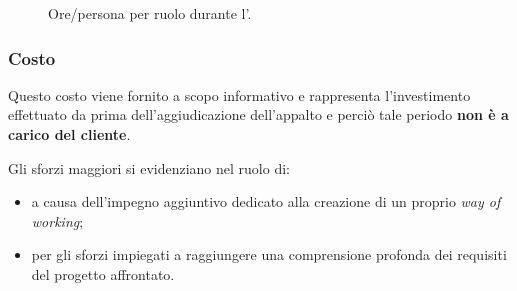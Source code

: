 \begin{figure}[H]
\caption{Ore/persona per ruolo durante l'\AR.}
\label{fig:ar2}
\end{figure}
	
\pagebreak
\subsubsection{Costo \AR}
	
\introcosto{\AR}
Questo costo viene fornito a scopo informativo e rappresenta l'investimento effettuato da \hx{} prima dell'aggiudicazione dell'appalto e perciò tale periodo \textbf{non è a carico del cliente}. 

Gli sforzi maggiori si evidenziano nel ruolo di:
\begin{itemize}
\item {\AMx} a causa dell'impegno aggiuntivo dedicato alla creazione di un proprio \emph{way of working};
\item {\ANx} per gli sforzi impiegati a raggiungere una comprensione profonda dei requisiti del progetto affrontato.
\end{itemize}

